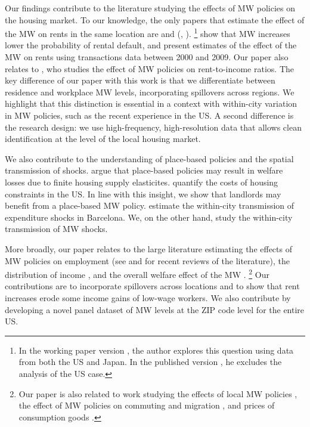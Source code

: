 
Our findings contribute to the literature studying the effects of MW policies 
on the housing market.
To our knowledge, the only papers that estimate the effect of the MW on rents 
in the same location are \textcite{Tidemann2018} and \citeauthor{Yamagishi2019} 
(\cite*{Yamagishi2019}, \cite*{Yamagishi2021}).%
\footnote{In the working paper version \parencite{Yamagishi2019}, the author 
	explores this question using data from both the US and Japan.
	In the published version \parencite{Yamagishi2021}, he excludes the analysis 
	of the US case.}
\textcite{AgarwalEtAl2021} show that MW increases lower the probability of 
rental default, and present estimates of the effect of the MW on rents using 
transactions data between 2000 and 2009.
Our paper also relates to \textcite{Hughes2020}, who studies the effect of 
MW policies on rent-to-income ratios.
The key difference of our paper with this work is that we differentiate 
between residence and workplace MW levels, incorporating spillovers across 
regions.
We highlight that this distinction is essential in a context with within-city
variation in MW policies, such as the recent experience in the US.
A second difference is the research design: we use high-frequency,
high-resolution data that allows clean identification at the level of the 
local housing market.

We also contribute to the understanding of place-based policies and the spatial 
transmission of shocks.
\textcite{KlineMoretti2014} argue that place-based policies may result in 
welfare losses due to finite housing supply elasticites.
\textcite{HsiehMoretti2019} quantify the costs of housing constraints in the US.
In line with this insight, we show that landlords may benefit from a place-based 
MW policy.
\textcite{AllenEtAl2020} estimate the within-city transmission of expenditure 
shocks in Barcelona.
We, on the other hand, study the within-city transmission of MW shocks.

More broadly, our paper relates to the large literature estimating the effects
of MW policies on employment
(see \cite{Dube2019} and \cite{NeumarkShirley2021} for recent reviews of the 
literature), 
the distribution of income \parencite[e.g.,][]{Lee1999, AutorEtAl2016, 
	Dube2019Income}, 
and the overall welfare effect of the MW \parencite{AhlfeldtEtAl2022,
	BergerHerkenhoffMongey2022}.%
\footnote{Our paper is also related to work studying 
	the effects of local MW policies 
	\parencite[e.g.,][]{DubeLindner2021, JardimEtAl2022seattle}, 
	the effect of MW policies on commuting and migration 
	\parencite[e.g.,]{Cadena2014, Monras2019, PerezPerez2021}, 
	and prices of consumption goods 
	\parencite[e.g.,]{AllegrettoReich2018, Leung2021}.}
Our contributions are to incorporate spillovers across locations 
\parencite[as in the recent work by][]{JardimEtAl2022discontinuity} and to show 
that rent increases erode some income gains of low-wage workers.
We also contribute by developing a novel panel dataset of MW levels at the 
ZIP code level for the entire US.

